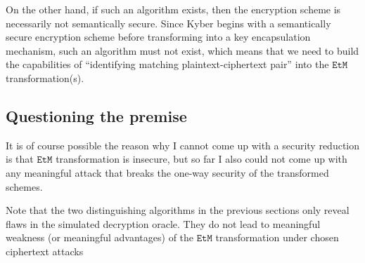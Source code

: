 \documentclass{article}
\newcommand{\monospace}{\texttt}
\newcommand{\etm}{\monospace{EtM}}  %
\begin{document}
On the other hand, if such an algorithm exists, then the encryption scheme is necessarily not semantically secure. Since Kyber begins with a semantically secure encryption scheme before transforming into a key encapsulation mechanism, such an algorithm must not exist, which means that we need to build the capabilities of ``identifying matching plaintext-ciphertext pair'' into the $\etm$ transformation(s).

\subsection{Questioning the premise}
It is of course possible the reason why I cannot come up with a security reduction is that $\etm$ transformation is insecure, but so far I also could not come up with any meaningful attack that breaks the one-way security of the transformed schemes.

Note that the two distinguishing algorithms in the previous sections only reveal flaws in the simulated decryption oracle. They do not lead to meaningful weakness (or meaningful advantages) of the $\etm$ transformation under chosen ciphertext attacks



\end{document}
